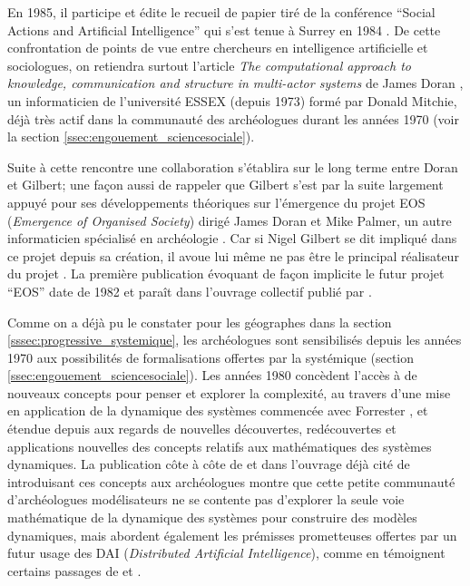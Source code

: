 En 1985, il participe et édite le recueil de papier tiré de la conférence \foreignquote{english}{Social Actions and Artificial Intelligence} qui s'est tenue à Surrey en 1984 \autocite{Gilbert1985}. De cette confrontation de points de vue entre chercheurs en intelligence artificielle et sociologues, on retiendra surtout l'article \textit{The computational approach to knowledge, communication and structure in multi-actor systems} de James Doran \autocite{Doran1985}, un informaticien de l'université ESSEX (depuis 1973) formé par Donald Mitchie, déjà très actif dans la communauté des archéologues durant les années 1970 (voir la section \ref{ssec:engouement_sciencesociale}). 

Suite à cette rencontre une collaboration s'établira sur le long terme entre Doran et Gilbert; une façon aussi de rappeler que Gilbert s'est par la suite largement appuyé pour ses développements théoriques sur l'émergence du projet EOS (\textit{Emergence of Organised Society}) dirigé James Doran et Mike Palmer, un autre informaticien spécialisé en archéologie \autocite{Doran1994a, Gilbert1995a}. Car si Nigel Gilbert se dit impliqué dans ce projet depuis sa création, il avoue lui même ne pas être le principal réalisateur du projet \autocite[122-131]{Gilbert1995a}. La première publication évoquant de façon implicite le futur projet \foreignquote{english}{EOS} date de 1982 \autocite{Doran1982} et paraît dans l'ouvrage collectif publié par \textcite{Renfrew1982}.

Comme on a déjà pu le constater pour les géographes dans la section \ref{sssec:progressive_systemique}, les archéologues sont sensibilisés depuis les années 1970 aux possibilités de formalisations offertes par la systémique (section \ref{ssec:engouement_sciencesociale}). Les années 1980 concèdent l'accès à de nouveaux concepts pour penser et explorer la complexité, au travers d'une mise en application de la dynamique des systèmes commencée avec Forrester \autocite{Forrester1961}, et étendue depuis aux regards de nouvelles découvertes, redécouvertes et applications nouvelles des concepts relatifs aux mathématiques des systèmes dynamiques. La publication côte à côte de \textcite{Doran1982} et \textcite{Allen1982} dans l'ouvrage déjà cité de \textcite{Renfrew1982} introduisant ces concepts aux archéologues montre que cette petite communauté d'archéologues modélisateurs ne se contente pas d'explorer la seule voie mathématique de la dynamique des systèmes pour construire des modèles dynamiques, mais abordent également les prémisses prometteuses offertes par un futur usage des DAI (\textit{Distributed Artificial Intelligence}), comme en témoignent certains passages de \textcite{Doran1982} et \textcite{Doran1986b}.

